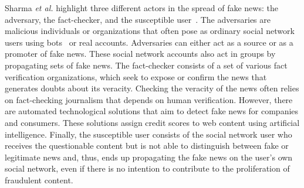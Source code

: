 \documentclass{ieeeaccess}
\begin{document}

Sharma {\it et al.} highlight three different actors in the spread of fake news: the adversary, the fact-checker, and the susceptible user~\cite{sharma2019combating}. The adversaries are malicious individuals or organizations that often pose as ordinary social network users using bots~\cite{botOrNot} or real accounts. Adversaries can either act as a source or as a promoter of fake news. These social network accounts also act in groups by propagating sets of fake news. The fact-checker consists of a set of various fact verification organizations, %
which seek to expose or confirm the news that generates doubts about its veracity. Checking the veracity of the news often relies on fact-checking journalism that depends on human verification. However, there are automated technological solutions that aim to detect fake news for companies and consumers. These solutions assign credit scores to web content using artificial intelligence. Finally, the susceptible user consists of the social network user who receives the questionable content but is not able to distinguish between fake or legitimate news and, thus, ends up propagating the fake news on the user's own social network, even if there is no intention to contribute to the proliferation of fraudulent content.
\end{document}

